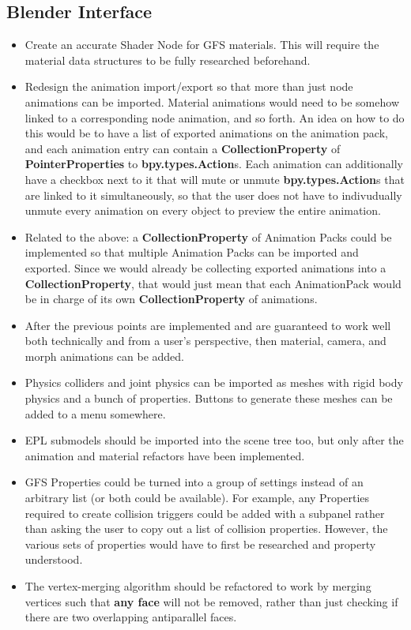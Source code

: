 \documentclass{article}
\begin{document}
\subsection{Blender Interface}
\begin{itemize}
\item Create an accurate Shader Node for GFS materials. This will require the material data structures to be fully researched beforehand.
\item Redesign the animation import/export so that more than just node animations can be imported. Material animations would need to be somehow linked to a corresponding node animation, and so forth. An idea on how to do this would be to have a list of exported animations on the animation pack, and each animation entry can contain a \textbf{CollectionProperty} of \textbf{PointerProperties} to \textbf{bpy.types.Action}s. Each animation can additionally have a checkbox next to it that will mute or unmute \textbf{bpy.types.Action}s that are linked to it simultaneously, so that the user does not have to indivudually unmute every animation on every object to preview the entire animation.
\item Related to the above: a \textbf{CollectionProperty} of Animation Packs could be implemented so that multiple Animation Packs can be imported and exported. Since we would already be collecting exported animations into a \textbf{CollectionProperty}, that would just mean that each AnimationPack would be in charge of its own \textbf{CollectionProperty} of animations.
\item After the previous points are implemented and are guaranteed to work well both technically and from a user's perspective, then material, camera, and morph animations can be added.
\item Physics colliders and joint physics can be imported as meshes with rigid body physics and a bunch of properties. Buttons to generate these meshes can be added to a menu somewhere.
\item EPL submodels should be imported into the scene tree too, but only after the animation and material refactors have been implemented.
\item GFS Properties could be turned into a group of settings instead of an arbitrary list (or both could be available). For example, any Properties required to create collision triggers could be added with a subpanel rather than asking the user to copy out a list of collision properties. However, the various sets of properties would have to first be researched and property understood.
\item The vertex-merging algorithm should be refactored to work by merging vertices such that \textbf{any face} will not be removed, rather than just checking if there are two overlapping antiparallel faces.
\end{itemize}
\end{document}
